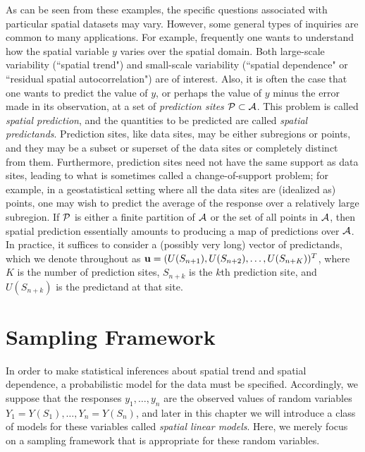 As can be seen from these examples, the specific questions associated with particular spatial datasets may vary.  However, some general types of inquiries are common to many applications.  For example, frequently one wants to understand how the spatial variable $y$ varies over the spatial domain.  Both large-scale variability (``spatial trend") and small-scale variability (``spatial dependence" or ``residual spatial autocorrelation") are of interest.  Also, it is often the case that one wants to predict the value of $y$, or perhaps the value of $y$ minus the error made in its observation, at a set of {\em prediction sites} ${\cal P}\subset{\cal A}$.  This problem is called {\em spatial prediction}, and the quantities to be predicted are called {\em spatial predictands}.  Prediction sites, like data sites, may be either subregions or points, and they may be a subset or superset of the data sites or completely distinct from them.  Furthermore, prediction sites need not have the same support as data sites, leading to what is sometimes called a change-of-support problem; for example, in a geostatistical setting where all the data sites are (idealized as) points, one may wish to predict the average of the response over a relatively large subregion.  If ${\cal P}$ is either a finite partition of ${\cal A}$ or the set of all points in ${\cal A}$, then spatial prediction essentially amounts to producing a map of predictions over ${\cal A}$.  In practice, it suffices to consider a (possibly very long) vector of predictands, which we denote throughout as ${\bf u}=(U(S_{n+1}),U(S_{n+2}),\ldots,U(S_{n+K}))^T$, where $K$ is the number of prediction sites, $S_{n+k}$ is the $k$th prediction site, and $U(S_{n+k})$ is the predictand at that site.


\section{Sampling Framework}

In order to make statistical inferences about spatial trend and spatial dependence, a probabilistic model for the data must be specified.  Accordingly, we suppose that the responses $y_1,\ldots, y_n$ are the observed values of random variables $Y_1=Y(S_1),\ldots,Y_n=Y(S_n)$, and later in this chapter we will introduce a class of models for these variables called {\em spatial linear models}.  Here, we merely focus on a sampling framework that is appropriate for these random variables.


